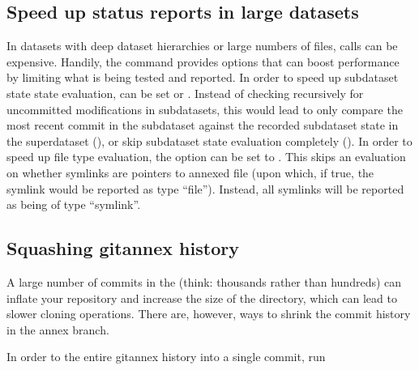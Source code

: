 \subsection{Speed up status reports in large datasets}
\label{\detokenize{basics/101-146-gists:speed-up-status-reports-in-large-datasets}}\label{\detokenize{basics/101-146-gists:speedystatus}}
\sphinxAtStartPar
In datasets with deep dataset hierarchies or large numbers of files,
 calls can be expensive. Handily,
the command provides options that can boost performance by limiting what is being
tested and reported. In order to speed up subdataset state state evaluation,
 can be set  or . Instead of checking
recursively for uncommitted modifications in subdatasets, this would lead 
to only compare the most recent commit {\hyperref[\detokenize{glossary:term-shasum}]{}} in the subdataset against
the recorded subdataset state in the superdataset (), or skip subdataset
state evaluation completely (). In order to speed up file type evaluation,
the option  can be set to . This skips an evaluation
on whether symlinks are pointers to annexed file (upon which, if true, the symlink
would be reported as type “file”). Instead, all symlinks will be reported as
being of type “symlink”.


\subsection{Squashing git\sphinxhyphen{}annex history}
\label{\detokenize{basics/101-146-gists:squashing-git-annex-history}}
\sphinxAtStartPar
A large number of commits in the {\hyperref[\detokenize{glossary:term-git-annex-branch}]{}} (think: thousands
rather than hundreds) can inflate your repository and increase the size of the
 directory, which can lead to slower cloning operations.
There are, however, ways to shrink the commit history in the annex branch.

\sphinxAtStartPar
In order to {\hyperref[\detokenize{glossary:term-squash}]{}} the entire git\sphinxhyphen{}annex history into a single commit, run

